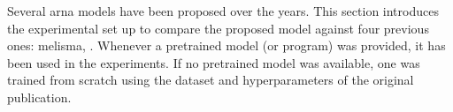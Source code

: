 
Several \gls{arna} models have been proposed over the years.
This section introduces the experimental set up to compare
the proposed model against four previous ones:
\gls{melisma}, \textcite{chen2021attend, micchi2021deep,
mcleod2021modular}. Whenever a pretrained model (or program)
was provided, it has been used in the experiments. If no
pretrained model was available, one was trained from scratch
using the dataset and hyperparameters of the original
publication. 
